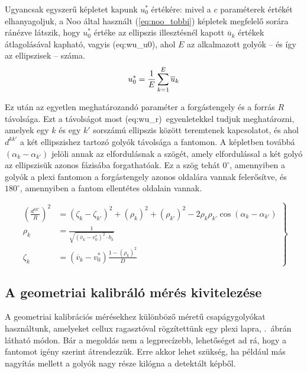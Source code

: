 \documentclass[a4paper,12pt]{article}
\begin{document}
Ugyancsak egyszerű képletet kapunk $u_0^*$ értékére: mivel a $c$ paraméterek értékét elhanyagoljuk, a Noo által használt (\ref{eq:noo_tobbi}) képletek megfelelő sorára ránézve látszik, hogy $u_0^*$ értéke az ellipszis illesztésnél kapott $\overline{u}_k$ értékek átlagolásával kapható, vagyis  \aref({eq:wu_u0}), ahol $E$ az alkalmazott golyók -- és így az ellipszisek -- száma. 
\begin{equation}
\label{eq:wu_u0}
u_0^* = \frac{1}{E} \sum_{k=1}^E \overline{u}_k\\
\end{equation}


Ez után az egyetlen meghatározandó paraméter a forgástengely és a forrás $R$ távolsága. Ezt a távolságot most \aref({eq:wu_r})~egyenletekkel tudjuk meghatározni, amelyek egy $k$ és egy $k'$ sorszámú ellipszis között teremtenek kapcsolatot, és ahol $d^{kk'}$ a két  ellipszishez tartozó golyók távolsága a fantomon. A képletben továbbá $ \left ( \alpha_k - \alpha_{k'} \right )$ jelöli annak az elfordulásnak a szögét, amely elfordulással a két golyó az ellipszisük azonos fázisába forgathatóak. Ez a szög tehát $0^\circ$, amennyiben a golyók a plexi fantomon a forgástengely azonos oldalára vannak felerősítve, és $180^\circ$, amennyiben a fantom ellentétes oldalain vannak.

\begin{equation}
\label{eq:wu_r}
\left .
\begin{split}
\left( \frac{d^{kk'}}{R} \right) ^2 & = \left ( \zeta_k - \zeta_{k'}  \right )^2  +  \left (\rho_{k} \right )^2 + \left (\rho_{k'} \right )^2  - 2\rho_k \rho_{k'} \cos  \left ( \alpha_k - \alpha_{k'} \right ) \\
\rho_k &= \frac{1}{\sqrt{\left (\overline{v}_k - v_0^* \right)^2 \cdot b_k}}\\
\zeta_k &= \left ( \overline{v}_k  - v_0^* \right ) \frac{ 1- \left( \rho_k \right) ^2 }{D} 
\end{split}
\right\}
\end{equation}


\subsection{A geometriai kalibráló mérés kivitelezése}

A geometriai kalibrációs mérésekhez különböző méretű csapágygolyókat használtunk, amelyeket cellux ragasztóval rögzítettünk egy plexi lapra, .~ábrán látható módon. Bár a megoldás nem a legprecízebb, lehetőséget ad rá, hogy a fantomot igény szerint átrendezzük. Erre akkor lehet szükség, ha például más nagyítás mellett a golyók nagy része kilógna a detektált képből.
\end{document}

